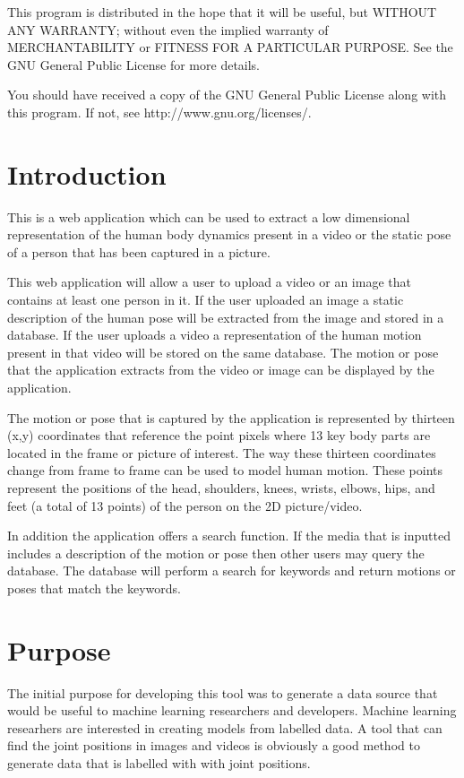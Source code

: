 \documentclass{scrreprt}
\begin{document}
    This program is distributed in the hope that it will be useful,
    but WITHOUT ANY WARRANTY; without even the implied warranty of
    MERCHANTABILITY or FITNESS FOR A PARTICULAR PURPOSE.  See the
    GNU General Public License for more details.

    You should have received a copy of the GNU General Public License
    along with this program.  If not, see http://www.gnu.org/licenses/.


\section{Introduction}

This is a web application which can be used to extract a low dimensional
representation of the human body dynamics present in a video or the static pose
of a person that has been captured in a picture.

This web application will allow a user to upload a video or an image that
contains at least one person in it. If the user uploaded an image a static
description of the human pose will be extracted from the image and stored in a
database.  If the user uploads a video a representation of the human motion
present in that video will be stored on the same database.  The motion or pose
that the application extracts from the video or image can be displayed by the
application.

The motion or pose that is captured by the application is represented by
thirteen (x,y) coordinates that reference the point pixels where 13 key body
parts are located in the frame or picture of interest.  The way these thirteen
coordinates change from frame to frame can be used to model human motion.
These points represent the positions of the head, shoulders, knees, wrists,
elbows, hips, and feet (a total of 13 points) of the person on the 2D
picture/video.

In addition the application offers a search function.  If the media that is
inputted includes a description of the motion or pose then other users may
query the database.  The database will perform a search for keywords and return
motions or poses that match the keywords.

\section{Purpose}

The initial purpose for developing this tool was to generate a data source that
would be useful to machine learning researchers and developers.  Machine
learning researhers are interested in creating models from labelled data.  A
tool that can find the joint positions in images and videos is obviously a good
method to generate data that is labelled with with joint positions.
\end{document}
